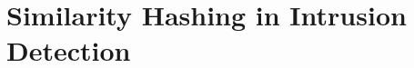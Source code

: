 \documentclass[../../main.tex]{subfiles}
\begin{document}
    
    


\newpage
\section{Similarity Hashing in Intrusion Detection}
\end{document}
